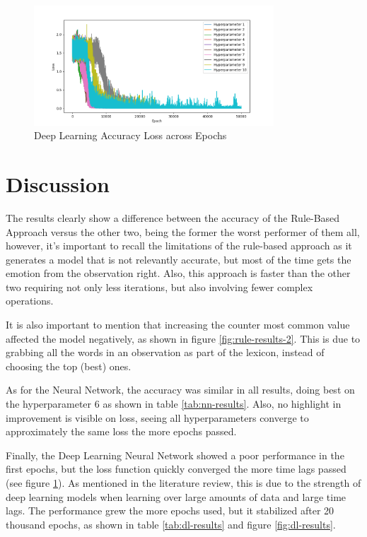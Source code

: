 \begin{figure}[H]
    \centering
    \includegraphics*[width=0.8\textwidth]{images/loss-dl.png}
    \caption{Deep Learning Accuracy Loss across Epochs}
    \label{fig:dl-results-2}
\end{figure}

\section{Discussion}

The results clearly show a difference between the accuracy of the Rule-Based Approach versus the other two, being the former the worst performer of them all, however, it’s important to recall the limitations of the rule-based approach as it generates a model that is not relevantly accurate, but most of the time gets the emotion from the observation right. Also, this approach is faster than the other two requiring not only less iterations, but also involving fewer complex operations.

It is also important to mention that increasing the counter most common value affected the model negatively, as shown in figure \ref{fig:rule-results-2}. This is due to grabbing all the words in an observation as part of the lexicon, instead of choosing the top (best) ones.

As for the Neural Network, the accuracy was similar in all results, doing best on the hyperparameter 6 as shown in table \ref{tab:nn-results}. Also, no highlight in improvement is visible on loss, seeing all hyperparameters converge to approximately the same loss the more epochs passed.

Finally, the Deep Learning Neural Network showed a poor performance in the first epochs, but the loss function quickly converged the more time lags passed (see figure \ref{fig:dl-results-2}). As mentioned in the literature review, this is due to the strength of deep learning models when learning over large amounts of data and large time lags. The performance grew the more epochs used, but it stabilized after 20 thousand epochs, as shown in table \ref{tab:dl-results} and figure \ref{fig:dl-results}.

